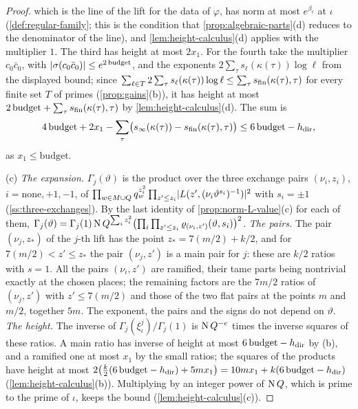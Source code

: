 \begin{proof}
which is the line of the lift for the data of $\varphi$, has norm at most $e^{\beta_\ell}$ at $\iota$ (\cref{def:regular-family}; this is the condition that \cref{prop:algebraic-parts}(d) reduces to the denominator of the line), and
\cref{lem:height-calculus}(d) applies with the multiplier $1$. The third has height at most $2x_1$. For the fourth take the
multiplier $c_0\bar c_0$, with $\lvert \sigma(c_0\bar c_0)\rvert\le e^{2\,\mathrm{budget}}$, and the exponents $2\sum_\tau s_\ell(\kappa(\tau))\log\ell$ from the displayed bound; since $\sum_{\ell\in T}2\sum_\tau s_\ell(\kappa(\tau))\log\ell\le\sum_\tau s_{\mathrm{fin}}(\kappa(\tau),\tau)$ for every finite set
$T$ of primes (\cref{prop:gains}(b)), it has height at most $2\,\mathrm{budget}+\sum_\tau s_{\mathrm{fin}}(\kappa(\tau),\tau)$ by \cref{lem:height-calculus}(d). The sum is
\[
  4\,\mathrm{budget}+2x_1-\sum_\tau\bigl(s_\infty(\kappa(\tau))-s_{\mathrm{fin}}(\kappa(\tau),\tau)\bigr)\le6\,\mathrm{budget}-h_{\mathrm{dir}},
\]
as $x_1\le\mathrm{budget}$.

(c) \emph{The expansion.} $\Gamma_j(\vartheta)$ is the product over the three exchange pairs $(\nu_i,z_i)$, $i=\mathrm{none},+1,-1$, of $\prod_{w\in M\cup Q}q_w^{z_i^2}\prod_{z'\le z_i}\lvert L(z',(\nu_i\vartheta^{s_i})^{-1})\rvert^2$ with $s_i=\pm1$ (\cref{ss:three-exchanges}). By the last identity of
\cref{prop:norm-L-value}(c) for each of them, $\Gamma_j(\vartheta)=\Gamma_j(1)\operatorname{N} Q^{\sum_iz_i^2}\bigl(\prod_i\prod_{z'\le z_i}\varrho_{(\nu_i,z')}(\vartheta,s_i)\bigr)^2$. \emph{The pairs.} The pair $(\nu_j,z_*)$ of the $j$-th lift has the point
$z_*=7(m/2)+k/2$, and for $7(m/2)<z'\le z_*$ the pair $(\nu_j,z')$ is a main pair for $j$: these are $k/2$ ratios with $s=1$. All the pairs $(\nu_i,z')$ are ramified, their tame parts being nontrivial exactly at the chosen
places; the remaining factors are the $7m/2$ ratios of $(\nu_j,z')$ with $z'\le7(m/2)$ and those of the two flat pairs at the points $m$ and $m/2$, together $5m$. The exponent, the pairs and the signs do not depend on $\vartheta$.
\emph{The height.} The inverse of $\Gamma_j(\xi^j_\iota)/\Gamma_j(1)$ is $\operatorname{N} Q^{-e}$ times the inverse squares of these ratios. A main ratio has inverse of height at most $6\,\mathrm{budget}-h_{\mathrm{dir}}$ by (b), and a ramified one at most $x_1$ by the
small ratios; the squares of the products have height at most $2\bigl(\frac k2(6\,\mathrm{budget}-h_{\mathrm{dir}})+5mx_1\bigr)=10mx_1+k(6\,\mathrm{budget}-h_{\mathrm{dir}})$ (\cref{lem:height-calculus}(b)). Multiplying by an integer power of $\operatorname{N} Q$, which is prime to the
prime of $\iota$, keeps the bound (\cref{lem:height-calculus}(c)).
\end{proof}
